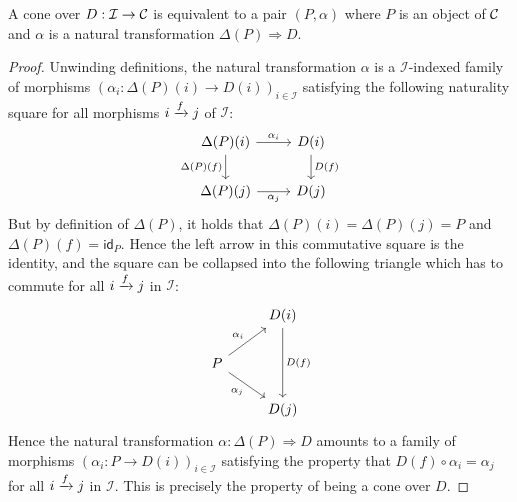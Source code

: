 \begin{proposition}
  A cone over \(D : \mathcal I \to \mathcal C\) is equivalent to a pair \((P,\alpha)\)
  where \(P\) is an object of \(\mathcal C\) and \(\alpha\) is a natural transformation
  \(\Delta(P) \Rightarrow D\).
\end{proposition}
\begin{proof}
  Unwinding definitions, the natural transformation \(\alpha\) is a \(\mathcal I\)-indexed family
  of morphisms \((\alpha_i : \Delta(P)(i) \to D(i))_{i\in \mathcal I}\)
  satisfying the following naturality square for all morphisms \(i\xrightarrow{f} j\) of \(\mathcal I\):
  \[
\begin{tikzcd}
\Delta(P)(i) \arrow[d, "\Delta(P)(f)"'] \arrow[r, "\alpha_i"] & D(i) \arrow[d, "D(f)"] \\
\Delta(P)(j) \arrow[r, "\alpha_j"']                           & D(j)
\end{tikzcd}
  \]
  But by definition of \(\Delta(P)\), it holds that \(\Delta(P)(i) = \Delta(P)(j) = P\)
  and \(\Delta(P)(f) = \mathsf{id}_P\).
  Hence the left arrow in this commutative square is the identity,
  and the square can be collapsed into the following triangle which has to commute for all \(i\xrightarrow{f} j\) in \(\mathcal I\):
  \[
\begin{tikzcd}
                                                 & D(i) \arrow[dd, "D(f)"] \\
P \arrow[ru, "\alpha_i"] \arrow[rd, "\alpha_j"'] &                         \\
                                                 & D(j)
\end{tikzcd}
  \]
  Hence the natural transformation \(\alpha : \Delta(P) \Rightarrow D\)
  amounts to a family of morphisms \((\alpha_i : P \to D(i))_{i\in \mathcal I}\)
  satisfying the property that \(D(f) \circ \alpha_i = \alpha_j\) for all \(i \xrightarrow{f} j\) in \(\mathcal I\).
  This is precisely the property of being a cone over \(D\).
\end{proof}

